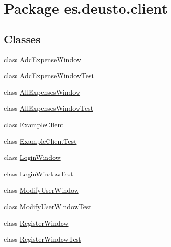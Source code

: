 \hypertarget{namespacees_1_1deusto_1_1client}{}\section{Package es.\+deusto.\+client}
\label{namespacees_1_1deusto_1_1client}
\subsection*{Classes}
\begin{DoxyCompactItemize}
\item 
class \hyperlink{classes_1_1deusto_1_1client_1_1_add_expense_window}{Add\+Expense\+Window}
\item 
class \hyperlink{classes_1_1deusto_1_1client_1_1_add_expense_window_test}{Add\+Expense\+Window\+Test}
\item 
class \hyperlink{classes_1_1deusto_1_1client_1_1_all_expenses_window}{All\+Expenses\+Window}
\item 
class \hyperlink{classes_1_1deusto_1_1client_1_1_all_expenses_window_test}{All\+Expenses\+Window\+Test}
\item 
class \hyperlink{classes_1_1deusto_1_1client_1_1_example_client}{Example\+Client}
\item 
class \hyperlink{classes_1_1deusto_1_1client_1_1_example_client_test}{Example\+Client\+Test}
\item 
class \hyperlink{classes_1_1deusto_1_1client_1_1_login_window}{Login\+Window}
\item 
class \hyperlink{classes_1_1deusto_1_1client_1_1_login_window_test}{Login\+Window\+Test}
\item 
class \hyperlink{classes_1_1deusto_1_1client_1_1_modify_user_window}{Modify\+User\+Window}
\item 
class \hyperlink{classes_1_1deusto_1_1client_1_1_modify_user_window_test}{Modify\+User\+Window\+Test}
\item 
class \hyperlink{classes_1_1deusto_1_1client_1_1_register_window}{Register\+Window}
\item 
class \hyperlink{classes_1_1deusto_1_1client_1_1_register_window_test}{Register\+Window\+Test}
\end{DoxyCompactItemize}
